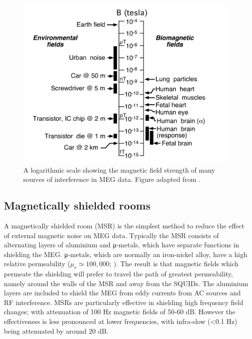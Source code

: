 \begin{figure}
	\begin{center}
		\includegraphics[width=0.7\linewidth]{./images/chapter1/noise_sources.png}\caption{A logarithmic scale showing the magnetic field strength of many sources of interference in MEG data. Figure adapted from \cite{Vrba1999}.}\label{fig_1_n0}
	\end{center}
\end{figure}

\subsection{Magnetically shielded rooms}
A magnetically shielded room (MSR) is the simplest method to reduce the effect of external magnetic noise on MEG data. Typically the MSR consists of alternating layers of aluminium and μ-metals, which have separate functions in shielding the MEG. μ-metals, which are normally an iron-nickel alloy, have a high relative permeability ($\mu_r \simeq 100,000$; \citealt{Hamalainen1993}). The result is that magnetic fields which permeate the shielding will prefer to travel the path of greatest permeability, namely around the walls of the MSR and away from the SQUIDs. The aluminium layers are included to shield the MEG from eddy currents from AC sources and RF interference. MSRs are particularly effective in shielding high frequency field changes; with attenuation of 100 Hz magnetic fields of 50-60 dB. However the effectiveness is less pronounced at lower frequencies, with infra-slow (<0.1 Hz) being attenuated by around 20 dB.

